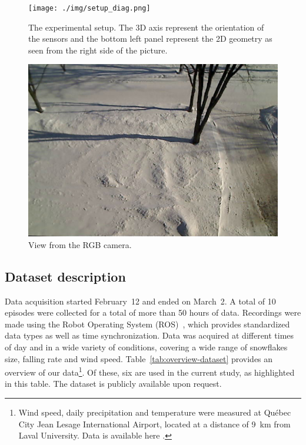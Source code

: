 \begin{figure}[th]
    \centering
    \texttt{[image: ./img/setup\_diag.png]}
    \caption{The experimental setup. The 3D axis represent the orientation of the sensors and the bottom left panel represent the 2D geometry as seen from the right side of the picture.}
    \label{fig:setup}
\end{figure}

\begin{figure}[th]
    \centering
    \includegraphics[width=0.90\linewidth]{./img/camera_view.jpg}
    \caption{View from the RGB camera.}
    \label{fig:view}
\end{figure} 

\subsection{Dataset description}
Data acquisition started February~12 and ended on March~2. A total of 10 episodes were collected for a total of more than 50 hours of data. Recordings were made using the Robot Operating System (ROS)~\cite{ROSWeb}, which provides standardized data types as well as time synchronization. Data was acquired at different times of day and in a wide variety of conditions, covering a wide range of snowflakes size, falling rate and wind speed.  Table~\ref{tab:overview-dataset} provides an overview of our data\footnote{Wind speed, daily precipitation and temperature were measured at Québec City Jean Lesage International Airport, located at a distance of \SI{9}{\km} from Laval University. Data is available here \cite{WeatherCanada}.}. Of these, six are used in the current study, as highlighted in this table. The dataset is publicly available upon request. %

